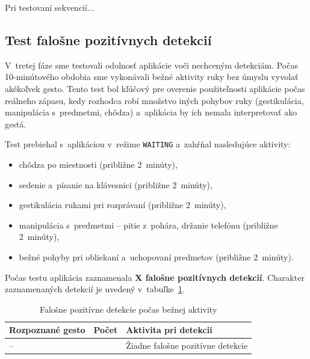 
Pri testovaní sekvencií... %

\subsection{Test falošne pozitívnych detekcií}
\label{subsec:test-false-positive}

V~tretej fáze sme testovali odolnosť aplikácie voči
nechceným detekciám. Počas 10-minútového obdobia
sme vykonávali bežné aktivity ruky bez úmyslu
vyvolať akékoľvek gesto. Tento test bol kľúčový pre
overenie použiteľnosti aplikácie počas reálneho
zápasu, kedy rozhodca robí množstvo iných pohybov
ruky (gestikulácia, manipulácia s~predmetmi, chôdza)
a~aplikácia by ich nemala interpretovať ako gestá.

Test prebiehal s~aplikáciou v~režime \texttt{WAITING}
a~zahŕňal nasledujúce aktivity:
\begin{itemize}
  \item chôdza po miestnosti (približne 2~minúty),
  \item sedenie a~písanie na klávesnici (približne 2~minúty),
  \item gestikulácia rukami pri rozprávaní (približne 2~minúty),
  \item manipulácia s~predmetmi -- pitie z~pohára,
        držanie telefónu (približne 2~minúty),
  \item bežné pohyby pri obliekaní a~uchopovaní predmetov
        (približne 2~minúty).
\end{itemize}

Počas testu aplikácia zaznamenala \textbf{X falošne
  pozitívnych detekcií}. %
Charakter zaznamenaných detekcií je uvedený
v~tabuľke~\ref{tab:test-false-positive}.

\begin{table}[H]
  \centering
  \caption{Falošne pozitívne detekcie počas bežnej aktivity}
  \label{tab:test-false-positive}
  \renewcommand{\arraystretch}{1.3}
  \begin{tabularx}{\textwidth}{
      >{\raggedright\arraybackslash}p{}
      >{\centering\arraybackslash}p{}
      >{\raggedright\arraybackslash}X
    }
    \toprule
    \textbf{Rozpoznané gesto} & \textbf{Počet} & \textbf{Aktivita pri detekcii}    \\
    \midrule
    --                        & 0              & Žiadne falošne pozitívne detekcie \\
    \bottomrule
  \end{tabularx}
\end{table}

